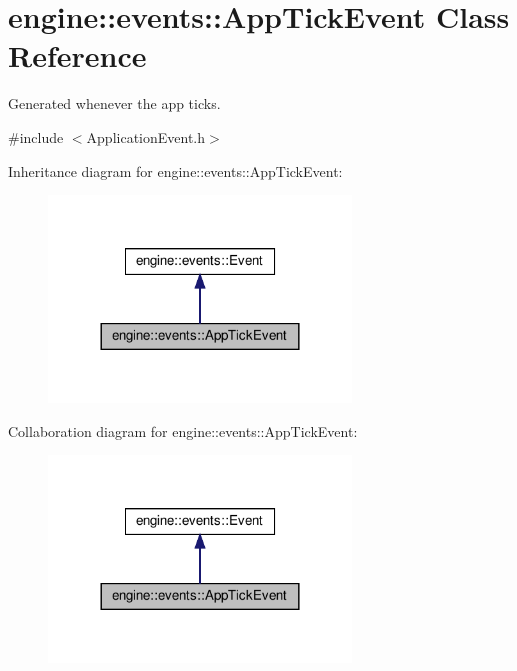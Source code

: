 \hypertarget{classengine_1_1events_1_1AppTickEvent}{}\section{engine\+:\+:events\+:\+:App\+Tick\+Event Class Reference}
\label{classengine_1_1events_1_1AppTickEvent}


Generated whenever the app ticks.  




{\ttfamily \#include $<$Application\+Event.\+h$>$}



Inheritance diagram for engine\+:\+:events\+:\+:App\+Tick\+Event\+:\nopagebreak
\begin{figure}[H]
\begin{center}
\leavevmode
\includegraphics[width=228pt]{classengine_1_1events_1_1AppTickEvent__inherit__graph}
\end{center}
\end{figure}


Collaboration diagram for engine\+:\+:events\+:\+:App\+Tick\+Event\+:\nopagebreak
\begin{figure}[H]
\begin{center}
\leavevmode
\includegraphics[width=228pt]{classengine_1_1events_1_1AppTickEvent__coll__graph}
\end{center}
\end{figure}
